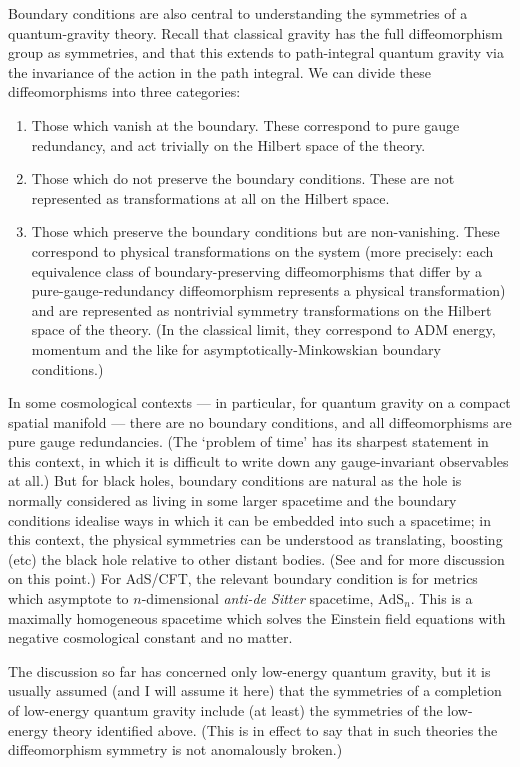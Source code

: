 \documentclass[12pt]{article}
\newcommand{\AdS}{\mathrm{AdS}}
\begin{document}
Boundary conditions are also central to understanding the symmetries of a quantum-gravity theory. Recall that classical gravity has the full diffeomorphism group as symmetries, and that this extends to path-integral quantum gravity via the invariance of the action in the path integral. We can divide these diffeomorphisms into three categories:
\begin{enumerate}
\item Those which vanish at the boundary. These correspond to pure gauge redundancy, and act trivially on the Hilbert space of the theory.
\item Those which do not preserve the boundary conditions. These are not represented as transformations at all on the Hilbert space.
\item Those which preserve the boundary conditions but are non-vanishing. These correspond to physical transformations on the system (more precisely: each equivalence class of boundary-preserving diffeomorphisms that differ by a pure-gauge-redundancy diffeomorphism represents a physical transformation) and are represented as nontrivial symmetry transformations on the Hilbert space of the theory. (In the classical limit, they correspond to ADM energy, momentum and the like for asymptotically-Minkowskian boundary conditions.)
\end{enumerate}
In some cosmological contexts --- in particular, for quantum gravity on a compact spatial manifold --- there are no boundary conditions, and all diffeomorphisms are pure gauge redundancies. (The `problem of time' has its sharpest statement in this context, in which it is difficult to write down any gauge-invariant observables at all.) But for black holes, boundary conditions are natural as the hole is normally considered as living in some larger spacetime and the boundary conditions idealise ways in which it can be embedded into such a spacetime; in this context, the physical symmetries can be understood as translating, boosting (etc) the black hole relative to other distant bodies. (See  and  for more discussion on this point.) For AdS/CFT, the relevant boundary condition is for metrics which asymptote to $n$-dimensional \emph{anti-de Sitter} spacetime, $\AdS_n$. This is a maximally homogeneous spacetime which solves the Einstein field equations with negative cosmological constant and no matter. 

The discussion so far has concerned only low-energy quantum gravity, but it is usually assumed (and I will assume it here) that the symmetries of a completion of low-energy quantum gravity include (at least) the symmetries of the low-energy theory identified above. (This is in effect to say that in such theories the diffeomorphism symmetry is not anomalously broken.)
\end{document}

